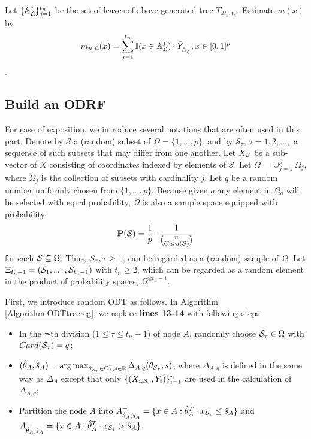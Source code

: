 \documentclass[nojss]{jss}
\numberwithin{equation}{section}
\DeclareMathOperator*{\argmax}{arg\,max}
\def\P{{\mathbf P}}
\def\S{{\cal S}}
\def\L{{\cal L}}
\begin{document}
Let $\{\mathbb{A}_\L^j\}_{j=1}^{t_n}$ be the set of leaves of above generated tree $T_{\mathcal{D}_n,t_n}$. Estimate $m(x)$ by
$$m_{n,\L}(x)=\sum_{j=1}^{t_n}{\mathbb{I}(x\in \mathbb{A}_\L^j)\cdot \bar{Y}_{\mathbb{A}_\L^j}}, x\in[0,1]^p$$.

\subsection{Build an ODRF }

For ease of exposition, we introduce several notations that are often used in this part. Denote by $\mathcal{S}$ a (random) subset of $ \Omega=\{ 1, ..., p\} $,  and by $\mathcal{S}_\tau,\ \tau=1, 2, ...,$  a sequence of such subsets that may differ from one another. Let $ X_\S $ be a sub-vector of $ X $ consisting of coordinates indexed by elements of $\mathcal{S}$.  Let  $\Omega =\cup_{j=1}^p\Omega _j$, where $\Omega _j$ is the collection of subsets with cardinality $j$. Let $q$ be a random number uniformly chosen from $\{1,\ldots,p\}$. Because given $q$ any element in $\Omega _q$ will be selected with equal probability, $\Omega $ is also a sample space equipped with probability
$$\P(\S)=\frac{1}{p}\cdot\frac{1}{\binom{n}{Card(\S)}}$$
for each $\S\subseteq \Omega $. Thus, $ \S_\tau, \tau\geq 1 $, can be regarded as a (random) sample of $ \Omega  $. Let $\Xi_{t_n-1}=(\S_1,\ldots, \S_{t_n-1})$  with  $t_n\geq 2$, which can be regarded as a random element in the product of probability spaces, $ \Omega  ^{\otimes t_n-1} $.

First, we introduce random ODT as follows. In Algorithm \ref{Algorithm.ODTtreereg}, we replace \textbf{lines 13-14} with following steps
\begin{itemize}
	\item In the $\tau$-th division ($1\le \tau\le t_n-1$) of node $A$, randomly choose $\S_\tau\in\Omega $ with  $Card(\S_\tau)=q$;
	\item $(\hat{\theta}_{A},\hat{s}_A)=\argmax_{\theta_{\S_\tau}\in\Theta^q,s\in\mathbb{R}}{\Delta_{A,q}({\theta}_{\S_\tau},s)}$, where $\Delta_{A,q}$ is defined in the same way as $\Delta_{A}$ except that only  $\{(X_{i,\S_\tau},Y_i)\}_{i=1}^n$ are used in the calculation of $\Delta_{A,q}$;
	\item Partition the node $A$ into $A^+_{\hat{\theta}_A,\hat{s}_A}=\{x\in A: \hat{\theta}_A^T\cdot x_{\S_\tau}\le \hat{s}_A\}$ and  $A^-_{\hat{\theta}_A,\hat{s}_A}=\{x\in A: \hat{\theta}_A^T\cdot x_{\S_\tau}> \hat{s}_A\}$.
\end{itemize}
\end{document}
